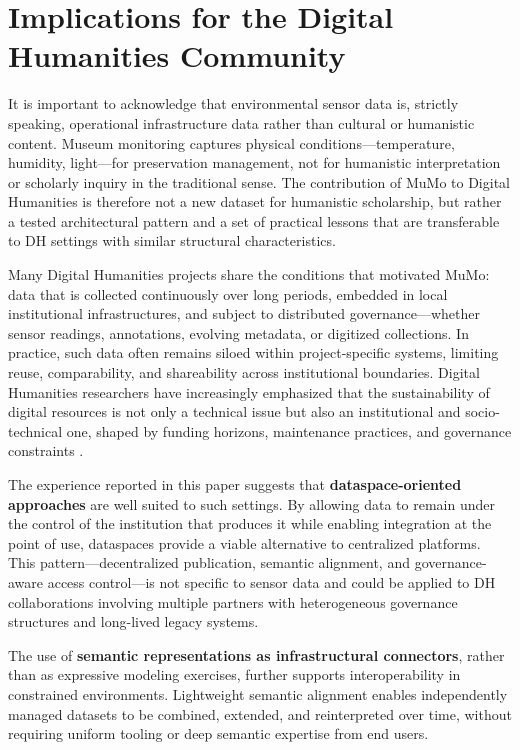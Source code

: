 \section{Implications for the Digital Humanities
Community}\label{sec:impact}

It is important to acknowledge that environmental sensor data is,
strictly speaking, operational infrastructure data rather than cultural
or humanistic content. Museum monitoring captures physical
conditions---temperature, humidity, light---for preservation management,
not for humanistic interpretation or scholarly inquiry in the
traditional sense. The contribution of MuMo to Digital Humanities is
therefore not a new dataset for humanistic scholarship, but rather a
tested architectural pattern and a set of practical lessons that are
transferable to DH settings with similar structural characteristics.

Many Digital Humanities projects share the conditions that motivated
MuMo: data that is collected continuously over long periods, embedded in
local institutional infrastructures, and subject to distributed
governance---whether sensor readings, annotations, evolving metadata, or
digitized collections. In practice, such data often remains siloed
within project-specific systems, limiting reuse, comparability, and
shareability across institutional boundaries. Digital Humanities
researchers have increasingly emphasized that the sustainability of
digital resources is not only a technical issue but also an
institutional and socio-technical one, shaped by funding horizons,
maintenance practices, and governance constraints
\cite{tucker2022facing, fenlon2020sustaining}.

The experience reported in this paper suggests that
\textbf{dataspace-oriented approaches} are well suited to such settings.
By allowing data to remain under the control of the institution that
produces it while enabling integration at the point of use, dataspaces
provide a viable alternative to centralized platforms. This
pattern---decentralized publication, semantic alignment, and
governance-aware access control---is not specific to sensor data and
could be applied to DH collaborations involving multiple partners with
heterogeneous governance structures and long-lived legacy systems.

The use of \textbf{semantic representations as infrastructural
connectors}, rather than as expressive modeling exercises, further
supports interoperability in constrained environments. Lightweight
semantic alignment enables independently managed datasets to be
combined, extended, and reinterpreted over time, without requiring
uniform tooling or deep semantic expertise from end users.

